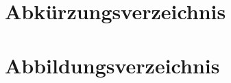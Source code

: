 \documentclass[a4paper,12pt,twoside,notitlepage, letterpaper]{article}
\begin{document}
\thispagestyle{fancy}



\begin{multicols}{2}
    

    \appendix

    \printbibliography[title=Literaturverzeichnis]

    \printglossary

    \section{Abkürzungsverzeichnis}
    \printacronyms[heading=none]

    \section{Abbildungsverzeichnis}
    \listoffigures
\end{multicols}
\end{document}

